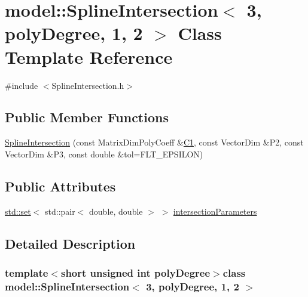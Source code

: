 \hypertarget{classmodel_1_1_spline_intersection_3_013_00_01poly_degree_00_011_00_012_01_4}{}\section{model\+:\+:Spline\+Intersection$<$ 3, poly\+Degree, 1, 2 $>$ Class Template Reference}
\label{classmodel_1_1_spline_intersection_3_013_00_01poly_degree_00_011_00_012_01_4}


{\ttfamily \#include $<$Spline\+Intersection.\+h$>$}

\subsection*{Public Member Functions}
\begin{DoxyCompactItemize}
\item 
\hyperlink{classmodel_1_1_spline_intersection_3_013_00_01poly_degree_00_011_00_012_01_4_a6c0aedca87b0e50bd5ca4f9c17efe0a1}{Spline\+Intersection} (const Matrix\+Dim\+Poly\+Coeff \&\hyperlink{_cubic_spline_intersection_8m_ab4c2e29f0027cddbda43c092248a07b9}{C1}, const Vector\+Dim \&P2, const Vector\+Dim \&P3, const double \&tol=F\+L\+T\+\_\+\+E\+P\+S\+I\+L\+O\+N)
\end{DoxyCompactItemize}
\subsection*{Public Attributes}
\begin{DoxyCompactItemize}
\item 
\hyperlink{plot_cells_8m_a03623d69001c34fc77654be29bdc3d8a}{std\+::set}$<$ std\+::pair$<$ double, double $>$ $>$ \hyperlink{classmodel_1_1_spline_intersection_3_013_00_01poly_degree_00_011_00_012_01_4_a41c8a31ab37c2112283a2e7fbbfab2f6}{intersection\+Parameters}
\end{DoxyCompactItemize}


\subsection{Detailed Description}
\subsubsection*{template$<$short unsigned int poly\+Degree$>$class model\+::\+Spline\+Intersection$<$ 3, poly\+Degree, 1, 2 $>$}



